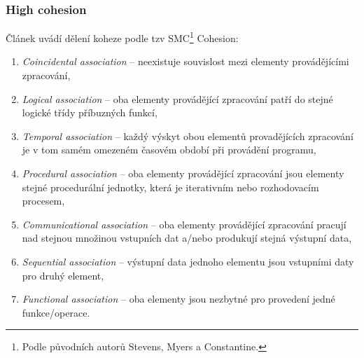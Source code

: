 


\subsubsection{High cohesion}
Článek \cite{ISI:000079726000029} uvádí dělení koheze podle tzv SMC\footnote{Podle původních autorů Stevens, Myers a Constantine.} Cohesion:
\begin{enumerate}
\item \emph{Coincidental association} -- neexistuje souvislost mezi elementy provádějícími zpracování,
\item \emph{Logical association} -- oba elementy provádějící zpracování patří do stejné logické třídy příbuzných funkcí,
\item \emph{Temporal association} -- každý výskyt obou elementů provadějících zpracování je v tom samém omezeném časovém období při provádění programu,
\item \emph{Procedural association} -- oba elementy provádějící zpracování jsou elementy stejné procedurální jednotky, která je iterativním nebo rozhodovacím procesem,
\item \emph{Communicational association} -- oba elementy provádějící zpracování pracují nad stejnou množinou vstupních dat a/nebo produkují stejná výstupní data,
\item \emph{Sequential association} -- výstupní data jednoho elementu jsou vstupními daty pro druhý element,
\item \emph{Functional association} -- oba elementy jsou nezbytné pro provedení jedné funkce/operace.
\end{enumerate}

